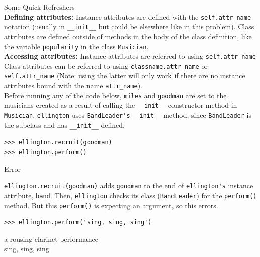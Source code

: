 \begin{blocksection}
\begin{solution}
Some Quick Refreshers \\
\textbf{Defining attributes:} Instance attributes are defined with the \lstinline{self.attr_name} notation (usually in \lstinline{__init__} but could be elsewhere like in this problem).
Class attributes are defined outside of methods in the body of the class definition, like the variable \lstinline{popularity} in the class \lstinline{Musician}. \\
\textbf{Accessing attributes:}
Instance attributes are referred to using \lstinline{self.attr_name} Class attributes can be referred to using \lstinline{classname.attr_name} or \lstinline{self.attr_name} (Note: using the latter will only work if there are no instance attributes bound with the name \lstinline{attr_name}). \\

Before running any of the code below, \lstinline{miles} and \lstinline{goodman} are set to the musicians created as a result of calling the \lstinline{__init__} constructor method in \lstinline{Musician}. \lstinline{ellington} uses \lstinline{BandLeader's} \lstinline{__init__} method, since \lstinline{BandLeader} is the subclass and has \lstinline{__init__} defined.
\end{solution}

\begin{lstlisting}
>>> ellington.recruit(goodman)
>>> ellington.perform()
\end{lstlisting}
\begin{solution}[.2in]
Error

\lstinline{ellington.recruit(goodman)} adds \lstinline{goodman} to the end of \lstinline{ellington's} instance attribute, \lstinline{band}. Then, \lstinline{ellington} checks its class (\lstinline{BandLeader}) for the \lstinline{perform()} method. But this \lstinline{perform()} is expecting an argument, so this errors.
\end{solution}

\vspace{1\baselineskip}

\begin{lstlisting}
>>> ellington.perform('sing, sing, sing')
\end{lstlisting}
\begin{solution}[.2in]
a rousing clarinet performance \\
sing, sing, sing


\end{solution}
\end{blocksection}
